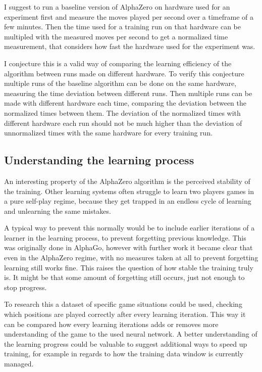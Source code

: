 \documentclass[12pt,onecolumn,oneside,titlepage]{article}
\begin{document}
I suggest to run a baseline version of AlphaZero on hardware used for an experiment first and measure the moves played per second over a timeframe of a few minutes. Then the time used for a training run on that hardware can be multipled with the 
measured moves per second to get a normalized time measurement, that considers how fast the hardware used for the experiment was.

I conjecture this is a valid way of comparing the learning efficiency of the algorithm between runs made on different hardware.
To verify this conjecture multiple runs of the baseline algorithm can be done on the same hardware, measuring the time deviation between different runs.
Then multiple runs can be made with different hardware each time, comparing the deviation between the normalized times between them.
The deviation of the normalized times with different hardware each run should not be much higher than the deviation of unnormalized times with the same hardware for every training run.


\subsection{Understanding the learning process}

An interesting property of the AlphaZero algorithm is the perceived stability of the training. Other learning systems often struggle to learn two players games in a pure self-play regime, because they get trapped in an endless cycle of learning and unlearning the same mistakes.

A typical way to prevent this normally would be to include earlier iterations of a learner in the learning process, to prevent forgetting previous knowledge.
This was originally done in AlphaGo, however with further work it became clear that even in the AlphaZero regime, with no measures taken at all to prevent forgetting learning still works fine.
This raises the question of how stable the training truly is. It might be that some amount of forgetting still occurs, just not enough to stop progress.

To research this a dataset of specific game situations could be used, checking which positions are played correctly after every learning iteration. This way it can be compared how every learning iterations adds or removes more understanding of the game to the used neural network.
A better understanding of the learning progress could be valuable to suggest additional ways to speed up training, for example in regards to how the training data window is currently managed.
\end{document}
